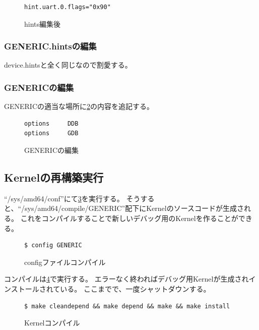 \documentclass[a4j]{jarticle}
\begin{document}
\begin{figure}[htbp]
	\centering
	\begin{lstlisting}[basicstyle=\ttfamily\footnotesize, frame=single, breaklines=true]
hint.uart.0.flags="0x90"
	\end{lstlisting}
	\caption{hints編集後}
	\label{fig:FreeBSD_af_hints}
\end{figure}

\subsubsection{GENERIC.hintsの編集}
device.hintsと全く同じなので割愛する。

\subsubsection{GENERICの編集}
GENERICの適当な場所に\ref{fig:FreeBSD_GENERIC}の内容を追記する。
\begin{figure}[htbp]
	\centering
	\begin{lstlisting}[basicstyle=\ttfamily\footnotesize, frame=single, breaklines=true]
options     DDB
options     GDB
	\end{lstlisting}
	\caption{GENERICの編集}
	\label{fig:FreeBSD_GENERIC}
\end{figure}

\subsection{Kernelの再構築実行}
\label{sec:Kern_build}
``/sys/amd64/conf''にて\ref{fig:FreeBSD_cf}を実行する。
そうすると、``/sys/amd64/compile/GENERIC''配下にKernelのソースコードが生成される。
これをコンパイルすることで新しいデバッグ用のKernelを作ることができる。
\begin{figure}[htbp]
	\centering
	\begin{lstlisting}[basicstyle=\ttfamily\footnotesize, frame=single, breaklines=true]
$ config GENERIC
	\end{lstlisting}
	\caption{configファイルコンパイル}
	\label{fig:FreeBSD_cf}
\end{figure}

コンパイルは\ref{fig:FreeBSD_kern}で実行する。
エラーなく終わればデバッグ用Kernelが生成されインストールされている。
ここまでで、一度シャットダウンする。
\begin{figure}[htbp]
	\centering
	\begin{lstlisting}[basicstyle=\ttfamily\footnotesize, frame=single, breaklines=true]
$ make cleandepend && make depend && make && make install
	\end{lstlisting}
	\caption{Kernelコンパイル}
	\label{fig:FreeBSD_kern}
\end{figure}
\end{document}

